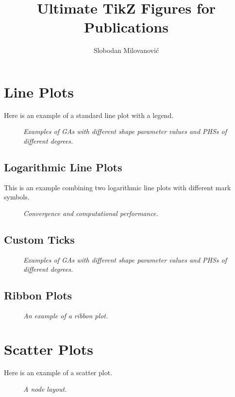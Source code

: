 \documentclass[11pt, oneside]{article}   	%
\title{Ultimate TikZ Figures for Publications}
\author{Slobodan Milovanovi\'c}
\begin{document}
\maketitle
%
%
%
\section{Line Plots}
Here is an example of a standard line plot with a legend.
%
\begin{figure}[H]
\centering

\caption{\emph{Examples of GAs with different shape parameter values and PHSs of different degrees.}}
\label{fig:RBF}
\end{figure}
%
%
\subsection{Logarithmic Line Plots}
This is an example combining two logarithmic line plots with different mark symbols.
\begin{figure}[H]
\centering


\caption{\emph{Convergence and computational performance.}}
\label{fig:log}
\end{figure}
%
\subsection{Custom Ticks}
%
\begin{figure}[H]
\centering

\caption{\emph{Examples of GAs with different shape parameter values and PHSs of different degrees.}}
\label{fig:payoff}
\end{figure}
%
\subsection{Ribbon Plots}
\begin{figure}[H]
\centering

\caption{\emph{An example of a ribbon plot.}}
\label{fig:ribbon}
\end{figure}
%
%
%
\newpage
\section{Scatter Plots}
Here is an example of a scatter plot.
\begin{figure}[H]
\centering

\caption{\emph{A node layout.}}
\label{fig:stencils}
\end{figure}
\end{document}
